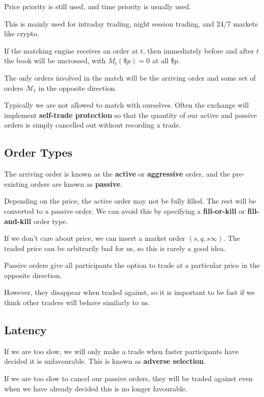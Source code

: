 \documentclass{article}
\begin{document}
Price priority is still used, and time priority is usually used.

This is mainly used for intraday trading, night session trading, and 24/7 markets like crypto.

If the matching engine receives an order at $t$, then immediately before and after $t$ the book will be uncrossed, with $M_t(\$p)=0$ at all $\$p$.

The only orders involved in the match will be the arriving order and some set of orders $\mathcal{M}_t$ in the opposite direction.

Typically we are not allowed to match with ourselves. Often the exchange will implement \textbf{self-trade protection} so that the quantity of our active and passive orders is simply cancelled out without recording a trade.

\subsection{Order Types}
The arriving order is known as the \textbf{active} or \textbf{aggressive} order, and the pre-existing orders are known as \textbf{passive}.%

Depending on the price, the active order may not be fully filled. The rest will be converted to a passive order. We can avoid this by specifying a \textbf{fill-or-kill} or \textbf{fill-and-kill} order type.

If we don't care about price, we can insert a market order $(s,q,s\infty)$. The traded price can be arbitrarily bad for us, so this is rarely a good idea.

Passive orders give all participants the option to trade at a particular price in the opposite direction.%

However, they disappear when traded against, so it is important to be fast if we think other traders will behave similarly to us.%

\subsection{Latency}
If we are too slow, we will only make a trade when faster participants have decided it is unfavourable. This is known as \textbf{adverse selection}.

If we are too slow to cancel our passive orders, they will be traded against even when we have already decided this is no longer favourable.
\end{document}

